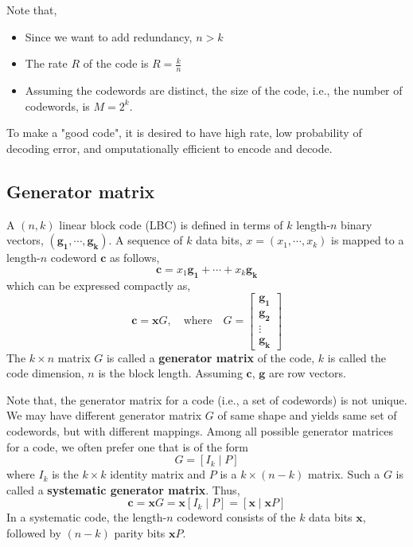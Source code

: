 \documentclass[11pt]{article}
\begin{document}
Note that,
\begin{itemize}
  \item Since we want to add redundancy, $n > k$
  \item The rate $R$ of the code is $R = \frac{k}{n}$
  \item Assuming the codewords are distinct, the size of the code, i.e., the number of codewords, is $M = 2^k$.
\end{itemize}
To make a "good code", it is desired to have high rate, low probability of decoding error, and omputationally efficient to encode and decode.

\subsection{Generator matrix}
A $(n,k)$ linear block code (LBC) is defined  in terms of $k$ length-$n$ binary vectors, $(\boldsymbol{g_1}, \cdots, \boldsymbol{g_k})$. A sequence of $k$ data bits, $x = (x_1, \cdots , x_k)$ is mapped to a length-$n$ codeword $\boldsymbol{c}$ as follows,
\[
\boldsymbol{c} = x_1 \boldsymbol{g_1} + \cdots + x_k \boldsymbol{g_k}
\]
which can be expressed compactly as,
\[
\boldsymbol{c} = \boldsymbol{x} G, \quad \text{where} \quad G = \left[ \begin{matrix} \boldsymbol{g_1} \\ \boldsymbol{g_2} \\ \vdots \\ \boldsymbol{g_k} \end{matrix} \right]
\]
The $k \times n$ matrix $G$ is called a \textbf{generator matrix} of the code, $k$ is called the code dimension, $n$ is the block length. Assuming $\boldsymbol{c}$, $\boldsymbol{g}$ are row vectors.

Note that, the generator matrix for a code (i.e., a set of codewords) is not unique. We may have different generator matrix $G$ of same shape and yields same set of codewords, but with different mappings. Among all possible generator matrices for a code, we often prefer
one that is of the form
\[
G = \left[ I_k \mid  P \right]
\]
where $I_k$ is the $k \times k$ identity matrix and $P$ is a $k \times (n - k)$ matrix. Such a $G$ is called a \textbf{systematic generator matrix}. Thus,
\[
\boldsymbol{c} = \boldsymbol{x} G = \boldsymbol{x} \left[ I_k \mid  P \right] = \left[ \boldsymbol{x}  \mid  \boldsymbol{x} P \right]
\]
In a systematic code, the length-$n$ codeword consists of the $k$ data bits $\boldsymbol{x}$, followed by $(n - k)$ parity bits $\boldsymbol{x} P$.
\end{document}
